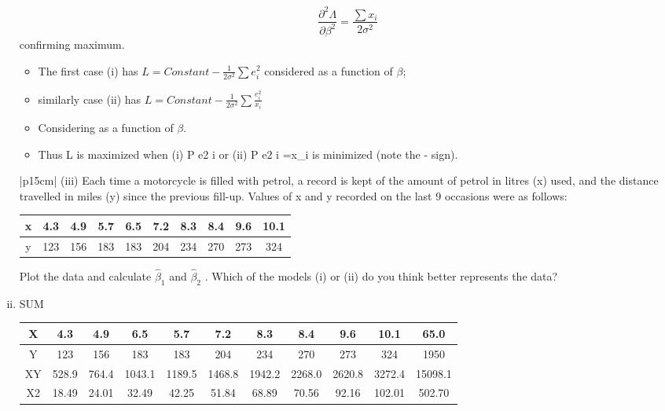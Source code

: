 \documentclass[a4paper,12pt]{article}
\begin{document}
\begin{enumerate}[(i)]
\[\frac{\partial^2\Lambda}{\partial \beta^2} = \frac{\sum x_i}{2\sigma^2}\] confirming maximum.
\begin{itemize}
\item The first case (i) has $L = Constant - \frac{1}{2\sigma^2} \sum {e^2_i}$
considered as a function of $\beta$;
\item similarly case (ii) has $L = Constant - \frac{1}{2\sigma^2} \sum \frac{e^2_i}{x_{i}}$

\item Considering as a function
of $\beta$. 
\item Thus L is maximized when (i)
P
e2
i or (ii)
P
e2
i =x_{i} is minimized (note
the - sign).
\end{itemize}
    
  \begin{table}[ht!]
     \centering
     \begin{tabular}{|p{15cm}|}
     \hline  
(iii) Each time a motorcycle is filled with petrol, a record is kept of the amount of petrol in litres (x) used, and the distance travelled in miles (y) since the previous fill-up. Values of x and y recorded on the last 9 occasions were as follows:
\begin{center}
 \begin{tabular}{|c||c|c|c|c|c|c|c|c|c|} \hline 
x & 4.3 & 4.9 & 5.7 & 6.5 & 7.2& 8.3 &8.4 &9.6 &10.1\\ \hline 
y & 123 & 156 & 183 & 183 & 204 & 234& 270 & 273 & 324\\ \hline 
\end{tabular}
   
\end{center}

Plot the data and calculate $\hat{\beta}_1$ and $\hat{\beta}_2$ .  Which of the models (i) or (ii) do you think better represents the data? 
\\ \hline
      \end{tabular}
    \end{table}
\item 
SUM
\begin{center}
\begin{tabular}{c|c|c|c|c|c|c|c|c|c|c|}\hline
X & 4.3& 4.9& 6.5& 5.7& 7.2& 8.3 &8.4 &9.6 &10.1 &  65.0\\ \hline
Y & 123 & 156 & 183 & 183 & 204&  234 & 270& 273 & 324 & 1950\\ \hline
XY & 528.9 & 764.4& 1043.1 & 1189.5& 1468.8& 1942.2 & 2268.0& 2620.8& 3272.4 & 15098.1\\ \hline
X2 & 18.49& 24.01& 32.49& 42.25& 51.84 & 68.89&  70.56& 92.16& 102.01 & 502.70\\ \hline
\end{tabular}
\end{center}



\end{enumerate}
\end{document}
